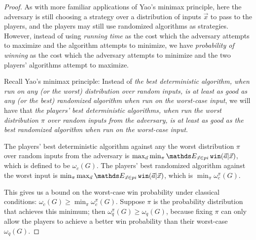 \begin{proof}

As with more familiar applications of Yao's minimax principle, here the adversary is still choosing a strategy over a distribution of inputs $\vec{x}$ to pass to the players, and the players may still use randomized algorithms as strategies. However, instead of using \emph{running time} as the cost which the adversary attempts to maximize and the algorithm attempts to minimize, we have \emph{probability of winning} as the cost which the adversary attempts to minimize and the two players' algorithms attempt to maximize. 

Recall Yao's minimax principle: Instead of \emph{the best deterministic algorithm, when run on any (or the worst) distribution over random inputs, is at least as good as any (or the best) randomized algorithm when run on the worst-case input}, we will have that \emph{the players' best deterministic algorithms, when run the worst distribution $\pi$ over random inputs from the adversary, is at least as good as the best randomized algorithm when run on the worst-case input}. 

The players' best deterministic algorithm against any the worst distribution $\pi$ over random inputs from the adversary is $\max_{\vec{a}} \min_{\pi} \Expected_{\vec{x} \in pi} \texttt{win}(\vec{a}|\vec{x})$, which is defined to be $\omega_c(G)$. The players' best randomized algorithm against the worst input is $\min_\pi \max_{\vec{a}} \Expected_{\vec{x} \in pi} \texttt{win}(\vec{a}|\vec{x})$, which is $\min_\pi \omega^\pi_c(G)$.

This gives us a bound on the worst-case win probability under classical conditions: $\omega_c(G) \geq \min_{\pi} \omega_c^\pi(G)$. Suppose $\pi$ is the probability distribution that achieves this minimum; then $\omega_q^\pi(G) \geq \omega_q(G)$, because fixing $\pi$ can only allow the players to achieve a better win probability than their worst-case $\omega_q(G)$.

\end{proof}




